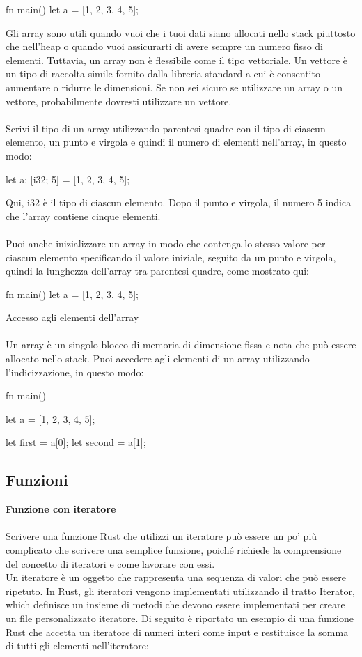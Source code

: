 \documentclass[11pt,a4paper]{article}
\begin{document}
\begin{rust}
fn main() {
    let a = [1, 2, 3, 4, 5];
}
\end{rust}

Gli array sono utili quando vuoi che i tuoi dati siano allocati nello stack piuttosto che nell'heap  o quando vuoi assicurarti di avere sempre un numero fisso di elementi. Tuttavia, un array non è flessibile come il tipo vettoriale. Un vettore è un tipo di raccolta simile fornito dalla libreria standard a cui è consentito aumentare o ridurre le dimensioni. Se non sei sicuro se utilizzare un array o un vettore, probabilmente dovresti utilizzare un vettore.\\
\\
Scrivi il tipo di un array utilizzando parentesi quadre con il tipo di ciascun elemento, un punto e virgola e quindi il numero di elementi nell'array, in questo modo:
\begin{rust}
let a: [i32; 5] = [1, 2, 3, 4, 5];
\end{rust}
Qui, i32 è il tipo di ciascun elemento. Dopo il punto e virgola, il numero 5 indica che l'array contiene cinque elementi.\\
\\
Puoi anche inizializzare un array in modo che contenga lo stesso valore per ciascun elemento specificando il valore iniziale, seguito da un punto e virgola, quindi la lunghezza dell'array tra parentesi quadre, come mostrato qui:
\begin{rust}
fn main() {
    let a = [1, 2, 3, 4, 5];
}
\end{rust}

\noindent Accesso agli elementi dell'array\\
\\
Un array è un singolo blocco di memoria di dimensione fissa e nota che può essere allocato nello stack. Puoi accedere agli elementi di un array utilizzando l'indicizzazione, in questo modo:

\begin{rust}
fn main() {
    let a = [1, 2, 3, 4, 5];

    let first = a[0];
    let second = a[1];
}
\end{rust}


\subsection{Funzioni}


\textbf{Funzione con iteratore}
\\
\\
Scrivere una funzione Rust che utilizzi un iteratore può essere un po' più complicato che scrivere una semplice funzione, poiché richiede la comprensione del concetto di iteratori e come lavorare con essi.\\ 
Un iteratore è un oggetto che rappresenta una sequenza di valori che può essere ripetuto. In Rust, gli iteratori vengono implementati utilizzando il tratto Iterator, which definisce un insieme di metodi che devono essere implementati per creare un file personalizzato iteratore.
Di seguito è riportato un esempio di una funzione Rust che accetta un iteratore di numeri interi come input e restituisce la somma di tutti gli elementi nell'iteratore:
\end{document}
